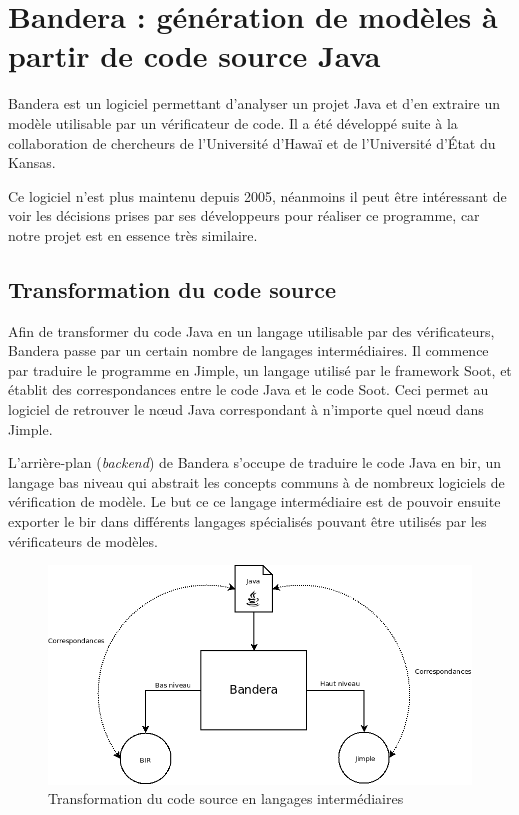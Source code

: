 \chapter{Bandera : génération de modèles à partir de code source Java}

Bandera est un logiciel permettant d'analyser un projet Java et d'en
extraire un modèle utilisable par un vérificateur de code. Il a été
développé suite à la collaboration de chercheurs de l'Université
d'Hawaï et de l'Université d'État du Kansas.

Ce logiciel n'est plus maintenu depuis 2005, néanmoins il peut être
intéressant de voir les décisions prises par ses développeurs pour
réaliser ce programme, car notre projet est en essence très similaire.

\section{Transformation du code source}

Afin de transformer du code Java en un langage utilisable par des
vérificateurs, Bandera passe par un certain nombre de langages
intermédiaires. Il commence par traduire le programme en Jimple, un
langage utilisé par le framework Soot, et établit des correspondances
entre le code Java et le code Soot. Ceci permet au logiciel de
retrouver le n\oe{}ud Java correspondant à n'importe quel n\oe{}ud
dans Jimple.

L'arrière-plan (\textit{backend}) de Bandera s'occupe de traduire le
code Java en \gls{bir}, un langage bas niveau qui abstrait les
concepts communs à de nombreux logiciels de vérification de modèle. Le
but ce ce langage intermédiaire est de pouvoir ensuite exporter le
\gls{bir} dans différents langages spécialisés pouvant être utilisés
par les vérificateurs de modèles.

\begin{figure}[h!]
  \centering
  \includegraphics[scale=0.5]{images/bandera_bir_jimple.png}
  \caption{\label{fig:bir_jimple} Transformation du code source en langages intermédiaires}
\end{figure}


